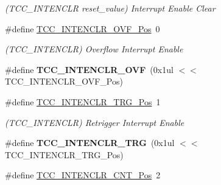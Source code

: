 \begin{DoxyCompactItemize}
\begin{DoxyCompactList}\small\item\em (T\+C\+C\+\_\+\+I\+N\+T\+E\+N\+C\+L\+R reset\+\_\+value) Interrupt Enable Clear \end{DoxyCompactList}\item 
\hypertarget{group___s_a_m_l21___t_c_c_ga16dc1a1c5ea4eb42a8e1c644e55a05da}{}\#define \hyperlink{group___s_a_m_l21___t_c_c_ga16dc1a1c5ea4eb42a8e1c644e55a05da}{T\+C\+C\+\_\+\+I\+N\+T\+E\+N\+C\+L\+R\+\_\+\+O\+V\+F\+\_\+\+Pos}~0\label{group___s_a_m_l21___t_c_c_ga16dc1a1c5ea4eb42a8e1c644e55a05da}

\begin{DoxyCompactList}\small\item\em (T\+C\+C\+\_\+\+I\+N\+T\+E\+N\+C\+L\+R) Overflow Interrupt Enable \end{DoxyCompactList}\item 
\hypertarget{group___s_a_m_l21___t_c_c_ga71f1e781f5f73b18fe828e5cfb84091d}{}\#define {\bfseries T\+C\+C\+\_\+\+I\+N\+T\+E\+N\+C\+L\+R\+\_\+\+O\+V\+F}~(0x1ul $<$$<$ T\+C\+C\+\_\+\+I\+N\+T\+E\+N\+C\+L\+R\+\_\+\+O\+V\+F\+\_\+\+Pos)\label{group___s_a_m_l21___t_c_c_ga71f1e781f5f73b18fe828e5cfb84091d}

\item 
\hypertarget{group___s_a_m_l21___t_c_c_gaecac70cad2f81a3f9781bb037b35eb5e}{}\#define \hyperlink{group___s_a_m_l21___t_c_c_gaecac70cad2f81a3f9781bb037b35eb5e}{T\+C\+C\+\_\+\+I\+N\+T\+E\+N\+C\+L\+R\+\_\+\+T\+R\+G\+\_\+\+Pos}~1\label{group___s_a_m_l21___t_c_c_gaecac70cad2f81a3f9781bb037b35eb5e}

\begin{DoxyCompactList}\small\item\em (T\+C\+C\+\_\+\+I\+N\+T\+E\+N\+C\+L\+R) Retrigger Interrupt Enable \end{DoxyCompactList}\item 
\hypertarget{group___s_a_m_l21___t_c_c_gaa12efad85464b88d4fc7037a6d6556fa}{}\#define {\bfseries T\+C\+C\+\_\+\+I\+N\+T\+E\+N\+C\+L\+R\+\_\+\+T\+R\+G}~(0x1ul $<$$<$ T\+C\+C\+\_\+\+I\+N\+T\+E\+N\+C\+L\+R\+\_\+\+T\+R\+G\+\_\+\+Pos)\label{group___s_a_m_l21___t_c_c_gaa12efad85464b88d4fc7037a6d6556fa}

\item 
\hypertarget{group___s_a_m_l21___t_c_c_ga30a9a746b5b369ca10a8b79c1ca55cbd}{}\#define \hyperlink{group___s_a_m_l21___t_c_c_ga30a9a746b5b369ca10a8b79c1ca55cbd}{T\+C\+C\+\_\+\+I\+N\+T\+E\+N\+C\+L\+R\+\_\+\+C\+N\+T\+\_\+\+Pos}~2\label{group___s_a_m_l21___t_c_c_ga30a9a746b5b369ca10a8b79c1ca55cbd}


\end{DoxyCompactItemize}
